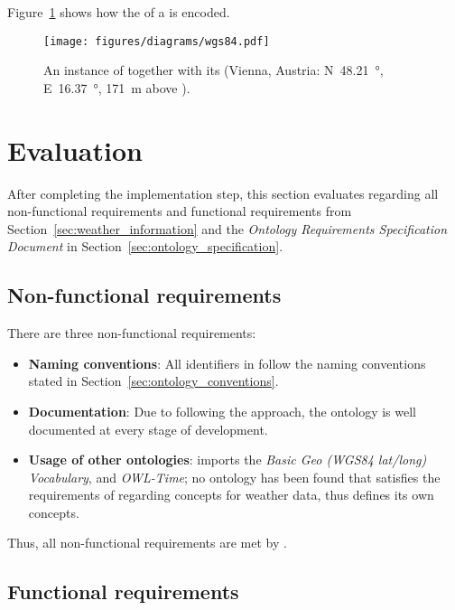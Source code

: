 Figure~\ref{fig:owl_wgs84} shows how the  of a  is encoded. %

\begin{figure}
  \centering
  \texttt{[image: figures/diagrams/wgs84.pdf]}
  \caption{An instance of  together with its  (Vienna, Austria: N~\SI{48.21}{\degree}, E~\SI{16.37}{\degree}, \SI{171}{\metre} above ).}
  \label{fig:owl_wgs84}
\end{figure}

\section{Evaluation}
\label{sec:ontology_evaluation}

After completing the implementation step, this section evaluates \smarthomeweather regarding all non-functional requirements and functional requirements from Section~\ref{sec:weather_information} and the \emph{Ontology Requirements Specification Document} in Section~\ref{sec:ontology_specification}.

\subsection{Non-functional requirements}
\label{sec:evaluation_non_functional}

There are three non-functional requirements:

\begin{itemize}
  \item \textbf{Naming conventions}: All identifiers in \smarthomeweather follow the naming conventions stated in Section~\ref{sec:ontology_conventions}.
  \item \textbf{Documentation}: Due to following the \methontology approach, the ontology is well documented at every stage of development.
  \item \textbf{Usage of other ontologies}: \smarthomeweather imports the \emph{Basic Geo (WGS84 lat/long) Vocabulary}, \muo and \emph{OWL-Time}; no ontology has been found that satisfies the requirements of \smarthomeweather regarding concepts for weather data, thus \smarthomeweather defines its own concepts.
\end{itemize}

Thus, all non-functional requirements are met by \smarthomeweather.

\subsection{Functional requirements}
\label{sec:evaluation_functional}

